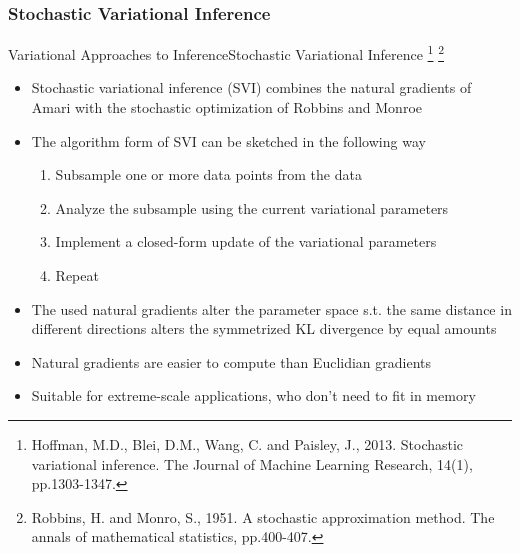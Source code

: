\documentclass[AERbeamer%
              ,optEnglish%
              ,optBiber%
              ,optBibstyleAlphabetic%
              ,optBeamerClassicFormat%
              ]{AERlatex}%
\begin{document}
\subsubsection*{Stochastic Variational Inference}
\begin{frame}[c]{Variational Approaches to Inference}{Stochastic Variational Inference \footnote{Hoffman, M.D., Blei, D.M., Wang, C. and Paisley, J., 2013. Stochastic variational
                                                                                                 inference. The Journal of Machine Learning Research, 14(1), pp.1303-1347.}
                                                                                       \footnote{Robbins, H. and Monro, S., 1951. A stochastic approximation method. The annals of 
                                                                                                 mathematical statistics, pp.400-407.}}
    \centering
    \begin{itemize}
        \item Stochastic variational inference (SVI) combines the natural gradients of Amari with the stochastic optimization of
              Robbins and Monroe
        \item The algorithm form of SVI can be sketched in the following way
        \begin{enumerate}
            \item Subsample one or more data points from the data
            \item Analyze the subsample using the current variational parameters
            \item Implement a closed-form update of the variational parameters
            \item Repeat
        \end{enumerate}
        \item The used natural gradients alter the parameter space s.t. the same distance in different directions
              alters the symmetrized KL divergence by equal amounts
        \item Natural gradients are easier to compute than Euclidian gradients
        \item Suitable for extreme-scale applications, who don't need to fit in memory
    \end{itemize}
\end{frame}
\end{document}
